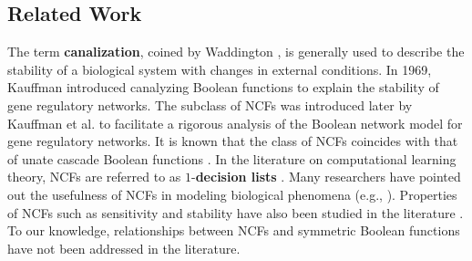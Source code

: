 \subsection{Related Work}
\label{sse:related}

The term \textbf{canalization}, coined by
Waddington \cite{Waddington-1942}, is generally used to describe
the stability of a biological system with changes
in external conditions.
In 1969, Kauffman \cite{Kauffman-1969} introduced canalyzing Boolean functions
to explain the stability of gene regulatory networks.
The subclass of NCFs was
introduced later by Kauffman et al. \cite{Kauffman-etal-2003} 
to facilitate a rigorous analysis of the Boolean network model
for gene regulatory networks.
It is known that the class of NCFs coincides with that
of unate cascade Boolean functions \cite{Jarrah-etal-2007}.
In the literature on computational learning theory,
NCFs are referred to as $1$-\textbf{decision lists} \cite{KV-1994}.
Many researchers have pointed out the usefulness of NCFs 
in modeling biological phenomena 
(e.g., \cite{Layne-2011,
Layne-etal-2012,Li-etal-2011,Li-etal-2012,Li-etal-2013}).
Properties of NCFs such as sensitivity and 
stability have also been studied in the 
literature \cite{Kauffman-etal-2004, Layne-2011,Layne-etal-2012,
Li-etal-2011,Li-etal-2013,Klotz-etal-2013, Stearns-etal-2018}. 
To our knowledge, relationships between NCFs and symmetric
Boolean functions have not been addressed in the literature.
